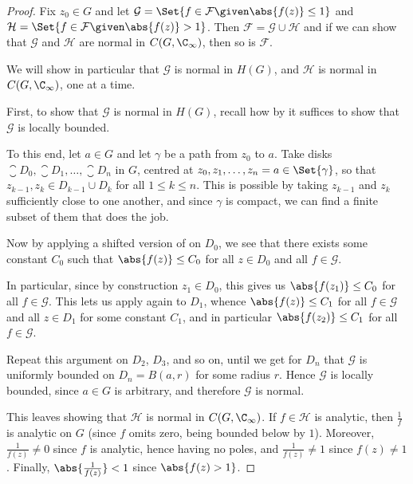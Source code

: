 \begin{proof}
	Fix $z_0 \in G$ and let $\mathcal{G} = \Set{f \in \mathcal{F} \given \abs{f(z)} \leq 1}$ and $\mathcal{H} = \Set{f \in \mathcal{F} \given \abs{f(z)} > 1}$.
	Then $\mathcal{F} = \mathcal{G} \cup \mathcal{H}$ and if we can show that $\mathcal{G}$ and $\mathcal{H}$ are normal in $C(G, \C_\infty)$, then so is $\mathcal{F}$.

	We will show in particular that $\mathcal{G}$ is normal in $H(G)$, and $\mathcal{H}$ is normal in $C(G, \C_\infty)$, one at a time.

	First, to show that $\mathcal{G}$ is normal in $H(G)$, recall how by  it suffices to show that $\mathcal{G}$ is locally bounded.

	To this end, let $a \in G$ and let $\gamma$ be a path from $z_0$ to $a$.
	Take disks $\closure{D_0}, \closure{D_1}, \dots, \closure{D_n}$ in $G$, centred at $z_0, z_1, \dots, z_n = a \in \Set{\gamma}$, so that $z_{k - 1}, z_k \in D_{k - 1} \cup D_k$ for all $1 \leq k \leq n$.
	This is possible by taking $z_{k - 1}$ and $z_k$ sufficiently close to one another, and since $\gamma$ is compact, we can find a finite subset of them that does the job.

	Now by applying a shifted version of  on $D_0$, we see that there exists some constant $C_0$ such that $\abs{f(z)} \leq C_0$ for all $z \in D_0$ and all $f \in \mathcal{G}$.

	In particular, since by construction $z_1 \in D_0$, this gives us $\abs{f(z_1)} \leq C_0$ for all $f \in \mathcal{G}$.
	This lets us apply  again to $D_1$, whence $\abs{f(z)} \leq C_1$ for all $f \in \mathcal{G}$ and all $z \in D_1$ for some constant $C_1$, and in particular $\abs{f(z_2)} \leq C_1$ for all $f \in \mathcal{G}$.

	Repeat this argument on $D_2$, $D_3$, and so on, until we get for $D_n$ that $\mathcal{G}$ is uniformly bounded on $D_n = B(a, r)$ for some radius $r$.
	Hence $\mathcal{G}$ is locally bounded, since $a \in G$ is arbitrary, and therefore $\mathcal{G}$ is normal.

	This leaves showing that $\mathcal{H}$ is normal in $C(G, \C_\infty)$.
	If $f \in \mathcal{H}$ is analytic, then $\frac{1}{f}$ is analytic on $G$ (since $f$ omits zero, being bounded below by $1$).
	Moreover, $\frac{1}{f(z)} \neq 0$ since $f$ is analytic, hence having no poles, and $\frac{1}{f(z)} \neq 1$ since $f(z) \neq 1$.
	Finally, $\abs{\frac{1}{f(z)}} < 1$ since $\abs{f(z) > 1}$.


\end{proof}
